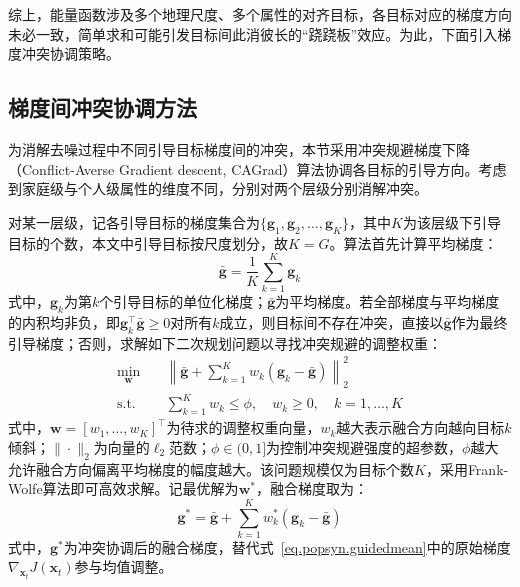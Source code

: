 综上，能量函数涉及多个地理尺度、多个属性的对齐目标，各目标对应的梯度方向未必一致，简单求和可能引发目标间此消彼长的``跷跷板''效应。为此，下面引入梯度冲突协调策略。
 
\subsection{梯度间冲突协调方法}\label{subsec.popsyn.guidance.conflict}
 
为消解去噪过程中不同引导目标梯度间的冲突，本节采用冲突规避梯度下降（Conflict-Averse Gradient descent, CAGrad）算法\cite{liuConflictAverseGradientDescent2024}协调各目标的引导方向。考虑到家庭级与个人级属性的维度不同，分别对两个层级分别消解冲突。
 
对某一层级，记各引导目标的梯度集合为$\{\mathbf{g}_1, \mathbf{g}_2, \ldots, \mathbf{g}_K\}$，其中$K$为该层级下引导目标的个数，本文中引导目标按尺度划分，故$K = G$。算法首先计算平均梯度：
\begin{equation}
  \bar{\mathbf{g}} = \frac{1}{K} \sum_{k=1}^{K} \mathbf{g}_k
  \label{eq.popsyn.avggrad}
\end{equation}
式中，$\mathbf{g}_k$为第$k$个引导目标的单位化梯度；$\bar{\mathbf{g}}$为平均梯度。若全部梯度与平均梯度的内积均非负，即$\mathbf{g}_k^{\top} \bar{\mathbf{g}} \geq 0$对所有$k$成立，则目标间不存在冲突，直接以$\bar{\mathbf{g}}$作为最终引导梯度；否则，求解如下二次规划问题以寻找冲突规避的调整权重：
\begin{equation}
  \begin{aligned}
    \min_{\mathbf{w}} \quad & \left\| \bar{\mathbf{g}} + \sum_{k=1}^{K} w_k \left(\mathbf{g}_k - \bar{\mathbf{g}}\right) \right\|_2^2 \\
    \text{s.t.} \quad & \sum_{k=1}^{K} w_k \leq \phi, \quad w_k \geq 0, \quad k = 1, \ldots, K
  \end{aligned}
  \label{eq.popsyn.cagradqp}
\end{equation}
式中，$\mathbf{w} = [w_1, \ldots, w_K]^{\top}$为待求的调整权重向量，$w_k$越大表示融合方向越向目标$k$倾斜；$\|\cdot\|_2$为向量的$\ell_2$范数；$\phi \in (0, 1]$为控制冲突规避强度的超参数，$\phi$越大允许融合方向偏离平均梯度的幅度越大。该问题规模仅为目标个数$K$，采用Frank-Wolfe算法即可高效求解。记最优解为$\mathbf{w}^{*}$，融合梯度取为：
\begin{equation}
  \mathbf{g}^{*} = \bar{\mathbf{g}} + \sum_{k=1}^{K} w_k^{*} \left(\mathbf{g}_k - \bar{\mathbf{g}}\right)
  \label{eq.popsyn.fusedgrad}
\end{equation}
式中，$\mathbf{g}^{*}$为冲突协调后的融合梯度，替代式~\eqref{eq.popsyn.guidedmean}中的原始梯度$\nabla_{\mathbf{x}_t} J(\mathbf{x}_t)$参与均值调整。
 
